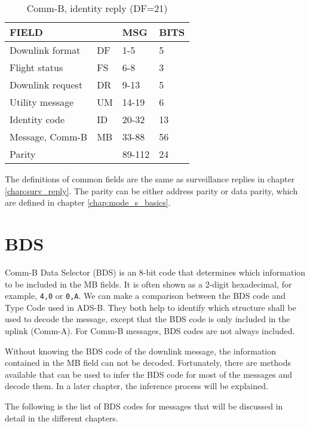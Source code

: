 \begin{table}[ht]
  \centering
  \caption{Comm-B, identity reply (DF=21)}
  \label{tb:df_21_structure}
  \begin{tabular}[t]{|l|l|l|l|}
  \hline
  \textbf{FIELD} & \textbf{} & \textbf{MSG} & \textbf{BITS} \\ \hline
  Downlink format         & DF & 1-5    & 5   \\ \hline
  Flight status           & FS & 6-8    & 3   \\ \hline
  Downlink request        & DR & 9-13   & 5   \\ \hline
  Utility message         & UM & 14-19  & 6   \\ \hline
  Identity code           & ID & 20-32  & 13  \\ \hline
  Message, Comm-B         & MB & 33-88  & 56  \\ \hline
  Parity  &  & 89-112  & 24  \\ \hline
  \end{tabular}
\end{table}

The definitions of common fields are the same as surveillance replies in chapter \ref{chap:surv_reply}. The parity can be either address parity or data parity, which are defined in chapter \ref{chap:mode_s_basics}.


\section{BDS}

Comm-B Data Selector (BDS) is an 8-bit code that determines which information to be included in the MB fields. It is often shown as a 2-digit hexadecimal, for example, \texttt{4,0} or \texttt{0,A}. We can make a comparison between the BDS code and Type Code used in ADS-B. They both help to identify which structure shall be used to decode the message, except that the BDS code is only included in the uplink (Comm-A). For Comm-B messages, BDS codes are not always included.

Without knowing the BDS code of the downlink message, the information contained in the MB field can not be decoded. Fortunately, there are methods available that can be used to infer the BDS code for most of the messages and decode them. In a later chapter, the inference process will be explained.

The following is the list of BDS codes for messages that will be discussed in detail in the different chapters.

